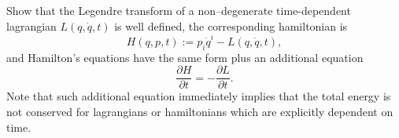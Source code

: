 \documentclass[english,fontsize=11pt,paper=a5,oneside]{scrbook}
\theoremstyle{definition}
\newenvironment{exercise}
  {\pushQED{\qed}\renewcommand{\qedsymbol}{$\maltese$}\exercisex}
  {\popQED\endexercisex}
\begin{document}
\begin{exercise}\label{exe:timedep}
    Show that the Legendre transform of a non--degenerate time-dependent lagrangian $L(q,\dot q, t)$ is well defined, the corresponding hamiltonian is
    \begin{equation}
        H(q,p,t) := p_i \dot q^i - L(q, \dot q, t),
    \end{equation}
    and Hamilton's equations have the same form plus an additional equation
    \begin{equation}
        \frac{\partial H}{\partial t} = - \frac{\partial L}{\partial t}.
    \end{equation}
    Note that such additional equation immediately implies that the total energy is not conserved for lagrangians or hamiltonians which are explicitly dependent on time.
\end{exercise}
\end{document}
